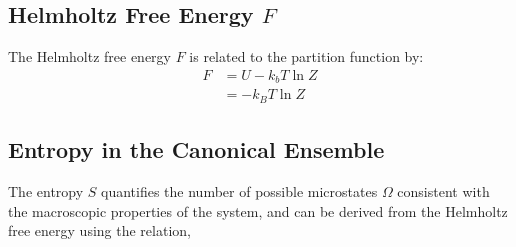 \documentclass{article}
\begin{document}
\subsection{Helmholtz Free Energy \( F \)}

The Helmholtz free energy \( F \) is related to the partition function by:
\begin{align}
F &= U - k_b T \ln Z\\
 &= -k_B T \ln Z
\end{align}

\subsection{Entropy in the Canonical Ensemble}

The entropy \( S \) quantifies the number of possible microstates \( \Omega \) consistent with the macroscopic properties of the system, and can be derived from the Helmholtz free energy using the relation,
\end{document}
